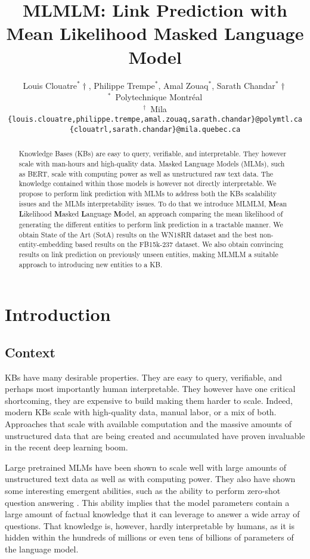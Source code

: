 \documentclass[11pt,a4paper]{article}
\title{MLMLM: Link Prediction with Mean Likelihood Masked Language Model}
\author{Louis Clouatre$^\ast\dagger$, Philippe Trempe$^\ast$, Amal Zouaq$^\ast$, Sarath Chandar$^\ast\dagger$\\
$^\ast$~Polytechnique Montréal\\
$^\dagger$~\textrm{Mila}\\
\texttt{\{louis.clouatre,philippe.trempe,amal.zouaq,sarath.chandar\}@polymtl.ca}\\
\texttt{\{clouatrl,sarath.chandar\}@mila.quebec.ca}}
\begin{document}
\maketitle

\begin{abstract}
Knowledge Bases (KBs) are easy to query, verifiable, and interpretable.
They however scale with man-hours and high-quality data.
Masked Language Models (MLMs), such as BERT, scale with computing power as well as unstructured raw text data. 
The knowledge contained within those models is however not directly interpretable.
We propose to perform link prediction with MLMs to address both the KBs scalability issues and the MLMs interpretability issues.
To do that we introduce MLMLM, \textbf{M}ean \textbf{L}ikelihood \textbf{M}asked \textbf{L}anguage \textbf{M}odel, an approach comparing the mean likelihood of generating the different entities to perform link prediction in a tractable manner.
We obtain State of the Art (SotA) results on the WN18RR dataset and the best non-entity-embedding based results on the FB15k-237 dataset.
We also obtain convincing results on link prediction on previously unseen entities, making MLMLM a suitable approach to introducing new entities to a KB. 

\end{abstract}

\section{Introduction}

\subsection{Context}



KBs have many desirable properties.
They are easy to query, verifiable, and perhaps most importantly human interpretable.
They however have one critical shortcoming, they are expensive to build making them harder to scale.
Indeed, modern KBs scale with high-quality data, manual labor, or a mix of both.
Approaches that scale with available computation and the massive amounts of unstructured data that are being created and accumulated have proven invaluable in the recent deep learning boom.


Large pretrained MLMs have been shown to scale well with large amounts of unstructured text data as well as with computing power.
They also have shown some interesting emergent abilities, such as the ability to perform zero-shot question answering .
This ability implies that the model parameters contain a large amount of factual knowledge that it can leverage to answer a wide array of questions.
That knowledge is, however, hardly interpretable by humans, as it is hidden within the hundreds of millions or even tens of billions of parameters of the language model.
\end{document}
